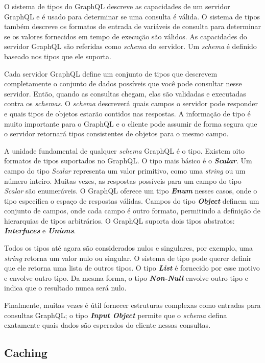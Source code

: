 O sistema de tipos do GraphQL descreve as capacidades de um servidor GraphQL e é usado para determinar se uma consulta é válida. O sistema de tipos também descreve os formatos de entrada de variáveis de consulta para determinar se os valores fornecidos em tempo de execução são válidos. As capacidades do servidor GraphQL são referidas como \textit{schema} do servidor. Um \textit{schema} é definido baseado nos tipos que ele suporta.

Cada servidor GraphQL define um conjunto de tipos que descrevem completamente o conjunto de dados possíveis que você pode consultar nesse servidor. Então, quando as consultas chegam, elas são validadas e executadas contra os \textit{schemas}. O \textit{schema} descreverá quais campos o servidor pode responder e quais tipos de objetos estarão contidos nas respostas. A informação de tipo é muito importante para o GraphQL e o cliente pode assumir de forma segura que o servidor retornará tipos consistentes de objetos para o mesmo campo.

A unidade fundamental de qualquer \textit{schema} GraphQL é o tipo. Existem oito formatos de tipos suportados no GraphQL. O tipo mais básico é o \textit{\textbf{Scalar}}. Um campo do tipo \textit{Scalar} representa um valor primitivo, como uma \textit{string} ou um número inteiro. Muitas vezes, as respostas possíveis para um campo  do tipo \textit{Scalar} são enumeráveis. O GraphQL oferece um tipo \textit{\textbf{Enum}} nesses casos, onde o tipo especifica o espaço de respostas válidas. Campos do tipo \textit{\textbf{Object}} definem um conjunto de campos, onde cada campo é outro formato, permitindo a definição de hierarquias de tipos arbitrários. O GraphQL suporta dois tipos abstratos:  \textit{\textbf{Interfaces}} e  \textit{\textbf{Unions}}.

Todos os tipos até agora são considerados nulos e singulares, por exemplo,  uma \textit{string} retorna um valor nulo ou singular. O sistema de tipo pode querer definir que ele retorna uma lista de outros tipos. O tipo \textit{\textbf{List}} é fornecido por esse motivo e envolve outro tipo. Da mesma forma, o tipo \textit{\textbf{Non-Null}} envolve outro tipo e indica que o resultado nunca será nulo.

Finalmente, muitas vezes é útil fornecer estruturas complexas como entradas para consultas GraphQL; o tipo \textit{\textbf{Input Object}} permite que o \textit{schema} defina exatamente quais dados são esperados do cliente nessas consultas.

\subsection{Caching}

